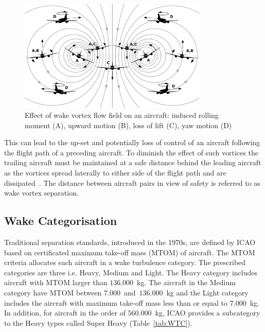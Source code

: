 \begin{figure}[h]
    \centering
    \includegraphics[width=0.8\textwidth]{graphics/reaction_in_wake.jpg}
    \caption[Wake vortex encounter]{Effect of wake vortex flow field on an aircraft: induced rolling moment (A), upward motion (B), loss of lift (C), yaw motion (D)~\cite[p.~33]{Hallock2018Apr}} 
    \label{fig:vortex_encounter}
\end{figure}

This can lead to the up-set and potentially loss of control of an aircraft following the flight path of a preceding aircraft.
To diminish the effect of such vortices the trailing aircraft must be maintained at a safe distance behind the leading aircraft as the vortices spread laterally to either side of the flight path and are dissipated~\cite{Breitsamter2011Feb}.
The distance between aircraft pairs in view of safety is referred to as wake vortex separation. 

\subsection{Wake Categorisation}
Traditional separation standards, introduced in the 1970s, are defined by ICAO based on certificated maximum take-off mass (MTOM) of aircraft. The MTOM criteria allocates each aircraft in a wake turbulence category. The prescribed categories are three i.e. Heavy, Medium and Light.
The Heavy category includes aircraft with MTOM larger than $136.000$~kg. The aircraft in the Medium category have MTOM between $7.000$~and~$136.000$~kg and the Light category includes the aircraft with maximum take-off mass less than or equal to $7.000$~kg.
In addition, for aircraft in the order of $560.000$~kg, ICAO provides a subcategory to the Heavy types called Super Heavy (Table~\ref{tab:WTC}). 

